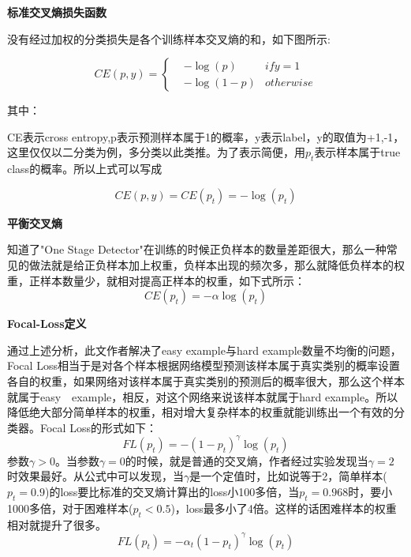 \textbf{标准交叉熵损失函数}

没有经过加权的分类损失是各个训练样本交叉熵的和，如下图所示:

\begin{equation}
CE(p,y)=\left\{
\begin{aligned}
& -\log (p) 	&if y = 1\\
& -\log (1-p) 	&otherwise
\end{aligned}
\right.
\end{equation}

其中：

CE表示cross entropy,p表示预测样本属于1的概率，y表示label，y的取值为{+1,-1}，这里仅仅以二分类为例，多分类以此类推。为了表示简便，用$p_t$表示样本属于true class的概率。所以上式可以写成

\begin{equation}
	CE(p,y) = CE(p_t) = -\log (p_t)	
\end{equation}
	
\textbf{平衡交叉熵}

知道了"One Stage Detector"在训练的时候正负样本的数量差距很大，那么一种常见的做法就是给正负样本加上权重，负样本出现的频次多，那么就降低负样本的权重，正样本数量少，就相对提高正样本的权重，如下式所示：
\begin{equation}
	CE(p_t) = -\alpha \log (p_t)
\end{equation}
	
\textbf{Focal-Loss定义}

通过上述分析，此文作者解决了easy example与hard example数量不均衡的问题，Focal Loss相当于是对各个样本根据网络模型预测该样本属于真实类别的概率设置各自的权重，如果网络对该样本属于真实类别的预测后的概率很大，那么这个样本就属于easy　example，相反，对这个网络来说该样本就属于hard example。所以降低绝大部分简单样本的权重，相对增大复杂样本的权重就能训练出一个有效的分类器。Focal Loss的形式如下： 
\begin{equation}
	FL(p_t) = -(1 - p_t)^\gamma \log (p_t)
\end{equation}
参数$\gamma　> 0$。当参数$\gamma = 0$的时候，就是普通的交叉熵，作者经过实验发现当$\gamma = 2$时效果最好。从公式中可以发现，当$\gamma
$是一个定值时，比如说等于2，简单样本($p_t = 0.9$)的loss要比标准的交叉熵计算出的loss小100多倍，当$p_t=0.968$时，要小1000多倍，对于困难样本($p_t < 0.5$)，loss最多小了4倍。这样的话困难样本的权重相对就提升了很多。 
\begin{equation}
	FL(p_t) = -\alpha _t(1 - p_t)^\gamma \log (p_t)
\end{equation}

